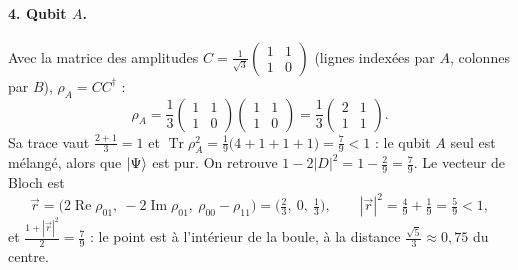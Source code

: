 \begin{correction}
\paragraph{4. Qubit $A$.} Avec la matrice des amplitudes $C=\frac{1}{\sqrt3}\begin{pmatrix}1&1\\1&0\end{pmatrix}$
(lignes indexées par $A$, colonnes par $B$), $\rho_A=CC^\dagger$ :
\[
  \rho_A=\frac13\begin{pmatrix}1&1\\1&0\end{pmatrix}\begin{pmatrix}1&1\\1&0\end{pmatrix}
  =\frac13\begin{pmatrix}2&1\\1&1\end{pmatrix}.
\]
Sa trace vaut $\frac{2+1}{3}=1$ et
$\operatorname{Tr}\rho_A^2=\frac19\big(4+1+1+1\big)=\frac79<1$ : le qubit $A$ seul est mélangé, alors que
$|\Psi\rangle$ est pur. On retrouve $1-2|D|^2=1-\frac29=\frac79$. Le vecteur de Bloch est
\[
  \vec r=\big(2\operatorname{Re}\rho_{01},\ -2\operatorname{Im}\rho_{01},\ \rho_{00}-\rho_{11}\big)
  =\big(\tfrac23,\ 0,\ \tfrac13\big),
  \qquad |\vec r|^2=\tfrac49+\tfrac19=\tfrac59<1,
\]
et $\frac{1+|\vec r|^2}{2}=\frac79$ : le point est à l'intérieur de la boule, à la distance
$\frac{\sqrt5}{3}\approx0{,}75$ du centre.
\end{correction}

